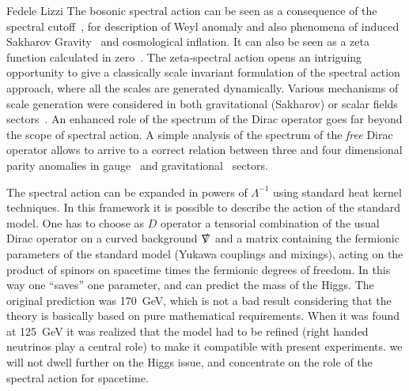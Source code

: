 \begin{artengenv}{Fedele Lizzi}
The bosonic spectral action can be seen as a consequence of the spectral cutoff~\cite{Andrianov:2010nr,Andrianov:2011bc,Kurkov:2012dn}, for description of Weyl anomaly and also phenomena of induced Sakharov Gravity~\cite{Sakharov} and cosmological inflation\cite{Kurkov:2013gma}. It can also be seen as a zeta function calculated in zero~\cite{zeta}. The zeta-spectral action opens an intriguing opportunity to give a classically scale invariant formulation of the spectral action approach, where all the scales are generated dynamically.  Various mechanisms of scale generation were considered in both gravitational (Sakharov) or scalar fields sectors~\cite{ripples}. An enhanced role of the spectrum of the Dirac operator goes  far beyond the scope of spectral action. A simple analysis of the spectrum of the \emph{free} Dirac operator allows to arrive to a correct relation between three and four dimensional parity anomalies in gauge~\cite{Kurkov:2017cdz} and gravitational~\cite{Kurkov:2018pjw} sectors.





The spectral action can be expanded in powers of $\Lambda^{-1}$ using standard heat kernel techniques.
In this framework it is possible to describe the action of the standard model.
One has to choose as $D$ operator a tensorial combination of the usual Dirac operator on a curved background  $\slashed\nabla$ and a matrix containing the fermionic parameters of the standard model (Yukawa couplings and mixings), acting on the product of spinors on spacetime times the fermionic degrees of freedom. In this way one ``saves'' one parameter, and can predict the mass of the Higgs. The original prediction was 170~GeV, which is not a bad result considering that the theory is basically based on pure mathematical requirements. When it was found at 125~GeV it was realized that the model had to be refined (right handed neutrinos play a central role) to make it compatible with present experiments. 
we will not dwell further on the Higgs issue, and concentrate on the role of the spectral action for spacetime.


\end{artengenv}
